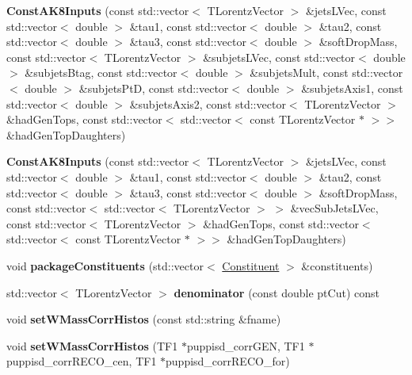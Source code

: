 \begin{DoxyCompactItemize}
\item 
\hypertarget{classttUtility_1_1ConstAK8Inputs_a3383d6cf39e78b5cf3e36fe6b3b0664e}{{\bfseries Const\-A\-K8\-Inputs} (const std\-::vector$<$ T\-Lorentz\-Vector $>$ \&jets\-L\-Vec, const std\-::vector$<$ double $>$ \&tau1, const std\-::vector$<$ double $>$ \&tau2, const std\-::vector$<$ double $>$ \&tau3, const std\-::vector$<$ double $>$ \&soft\-Drop\-Mass, const std\-::vector$<$ T\-Lorentz\-Vector $>$ \&subjets\-L\-Vec, const std\-::vector$<$ double $>$ \&subjets\-Btag, const std\-::vector$<$ double $>$ \&subjets\-Mult, const std\-::vector$<$ double $>$ \&subjets\-Pt\-D, const std\-::vector$<$ double $>$ \&subjets\-Axis1, const std\-::vector$<$ double $>$ \&subjets\-Axis2, const std\-::vector$<$ T\-Lorentz\-Vector $>$ \&had\-Gen\-Tops, const std\-::vector$<$ std\-::vector$<$ const T\-Lorentz\-Vector $\ast$ $>$$>$ \&had\-Gen\-Top\-Daughters)}\label{classttUtility_1_1ConstAK8Inputs_a3383d6cf39e78b5cf3e36fe6b3b0664e}

\item 
\hypertarget{classttUtility_1_1ConstAK8Inputs_aded941e18d86f235e8e20101fda1e940}{{\bfseries Const\-A\-K8\-Inputs} (const std\-::vector$<$ T\-Lorentz\-Vector $>$ \&jets\-L\-Vec, const std\-::vector$<$ double $>$ \&tau1, const std\-::vector$<$ double $>$ \&tau2, const std\-::vector$<$ double $>$ \&tau3, const std\-::vector$<$ double $>$ \&soft\-Drop\-Mass, const std\-::vector$<$ std\-::vector$<$ T\-Lorentz\-Vector $>$ $>$ \&vec\-Sub\-Jets\-L\-Vec, const std\-::vector$<$ T\-Lorentz\-Vector $>$ \&had\-Gen\-Tops, const std\-::vector$<$ std\-::vector$<$ const T\-Lorentz\-Vector $\ast$ $>$$>$ \&had\-Gen\-Top\-Daughters)}\label{classttUtility_1_1ConstAK8Inputs_aded941e18d86f235e8e20101fda1e940}

\item 
\hypertarget{classttUtility_1_1ConstAK8Inputs_a8ed6e23d77aec6b257c6cd2c383e41a1}{void {\bfseries package\-Constituents} (std\-::vector$<$ \hyperlink{classConstituent}{Constituent} $>$ \&constituents)}\label{classttUtility_1_1ConstAK8Inputs_a8ed6e23d77aec6b257c6cd2c383e41a1}

\item 
\hypertarget{classttUtility_1_1ConstAK8Inputs_acf5080a09bbaf261d42cba91e6d5274a}{std\-::vector$<$ T\-Lorentz\-Vector $>$ {\bfseries denominator} (const double pt\-Cut) const }\label{classttUtility_1_1ConstAK8Inputs_acf5080a09bbaf261d42cba91e6d5274a}

\item 
\hypertarget{classttUtility_1_1ConstAK8Inputs_a331aa8e6bbefade26efd24be32ad1b5d}{void {\bfseries set\-W\-Mass\-Corr\-Histos} (const std\-::string \&fname)}\label{classttUtility_1_1ConstAK8Inputs_a331aa8e6bbefade26efd24be32ad1b5d}

\item 
\hypertarget{classttUtility_1_1ConstAK8Inputs_a64b27b878a5c341b37defe5637b554fc}{void {\bfseries set\-W\-Mass\-Corr\-Histos} (T\-F1 $\ast$puppisd\-\_\-corr\-G\-E\-N, T\-F1 $\ast$puppisd\-\_\-corr\-R\-E\-C\-O\-\_\-cen, T\-F1 $\ast$puppisd\-\_\-corr\-R\-E\-C\-O\-\_\-for)}\label{classttUtility_1_1ConstAK8Inputs_a64b27b878a5c341b37defe5637b554fc}

\end{DoxyCompactItemize}
